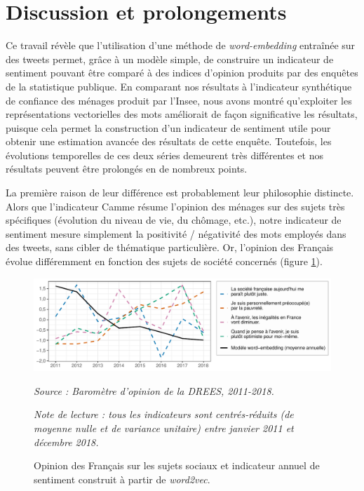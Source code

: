 \documentclass[11pt,french,french]{article}
\begin{document}
\section*{Discussion et
prolongements}\label{discussion-et-prolongements}

Ce travail révèle que l'utilisation d'une méthode de
\emph{word-embedding} entraînée sur des tweets permet, grâce à un modèle
simple, de construire un indicateur de sentiment pouvant être comparé à
des indices d'opinion produits par des enquêtes de la statistique
publique. En comparant nos résultats à l'indicateur synthétique de
confiance des ménages produit par l'Insee, nous avons montré
qu'exploiter les représentations vectorielles des mots améliorait de
façon significative les résultats, puisque cela permet la construction
d'un indicateur de sentiment utile pour obtenir une estimation avancée
des résultats de cette enquête. Toutefois, les évolutions temporelles de
ces deux séries demeurent très différentes et nos résultats peuvent être
prolongés en de nombreux points.

La première raison de leur différence est probablement leur philosophie
distincte. Alors que l'indicateur Camme résume l'opinion des ménages sur
des sujets très spécifiques (évolution du niveau de vie, du chômage,
etc.), notre indicateur de sentiment mesure simplement la positivité /
négativité des mots employés dans des tweets, sans cibler de thématique
particulière. Or, l'opinion des Français évolue différemment en fonction
des sujets de société concernés (figure \ref{fig:figconclu}).

\begin{figure}[htp]
{\centering \includegraphics[width =\textwidth]{img/rmd-graphConclu-1}}
\captionsetup{margin=0cm,format=hang,justification=justified}
\caption{Opinion des Français sur les sujets sociaux et indicateur annuel de sentiment construit à partir de \emph{word2vec}.}\label{fig:figconclu}
\footnotesize
\emph{Source : Baromètre d'opinion de la DREES, 2011-2018.}

\emph{Note de lecture : tous les indicateurs sont centrés-réduits (de moyenne nulle et de variance unitaire) entre janvier 2011 et décembre 2018.}
\end{figure}
\end{document}
